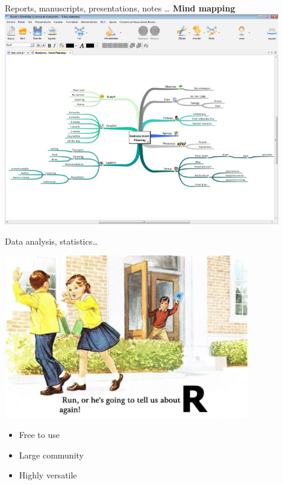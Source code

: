 \documentclass[10pt]{beamer}%
\begin{document}
\begin{frame}{Reports, manuscripts, presentations, notes \dots}
\centering
\textbf{Mind mapping}
\includegraphics[width=0.9\textwidth]{Figures/mindmaps}
\end{frame}

\begin{frame}{Data analysis, statistics\dots }
    \pause
\begin{center}
\includegraphics[width=0.8\textwidth]{Figures/ralert}
\end{center}
\begin{itemize}
 \item Free to use
\item Large community
\item Highly versatile
\end{itemize}
\end{frame}
\end{document}
